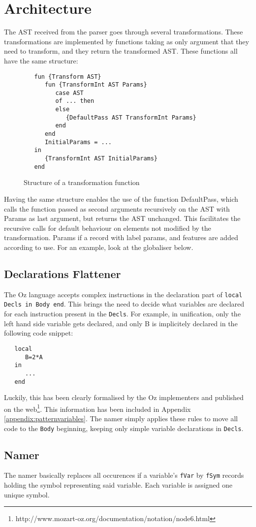 \documentclass[a4paper]{memoir}
\begin{document}
\section{Architecture}
The AST received from the parser goes through several transformations. These transformations are implemented by functions taking as only argument that they need to transform, and they return the transformed AST.
These functions all have the same structure:
\begin{figure}[h]
\begin{lstlisting}
   fun {Transform AST}
      fun {TransformInt AST Params}
         case AST
         of ... then
         else
            {DefaultPass AST TransformInt Params}
         end
      end
      InitialParams = ...
   in
      {TransformInt AST InitialParams}
   end
\end{lstlisting}
\caption{Structure of a transformation function}
\end{figure}
Having the same structure enables the use of the function DefaultPass, which calls the function passed as second arguments recursively on the AST with Params as last argument, but returns the AST unchanged. This facilitates the recursive calls for default behaviour on elements not modified by the transformation.
Params if a record with label params, and features are added according to use. For an example, look at the globaliser below.%
\subsection{Declarations Flattener}
The Oz language accepts complex instructions in the declaration part of \lstinline!local Decls in Body end!. This brings the need to decide what variables are declared for each instruction present in the \lstinline!Decls!. 
For example, in unification, only the left hand side variable gets declared, and only B is implicitely declared in the following code snippet:
\begin{lstlisting}
   local
      B=2*A
   in
      ...
   end
\end{lstlisting}
Luckily, this has been clearly formalised by the Oz implementers and published on the web\footnote[]{http://www.mozart-oz.org/documentation/notation/node6.html}. This information has been included in Appendix \ref{appendix:patternvariables}. The namer simply applies these rules to move all code to the \lstinline!Body! beginning, keeping only simple variable declarations in \lstinline!Decls!.

\subsection{Namer}\label{sec:arch:namer}
The namer  basically replaces all occurences if a variable's \lstinline!fVar! by \lstinline!fSym! records holding the symbol representing said variable. Each variable is assigned one unique symbol. 
\end{document}
